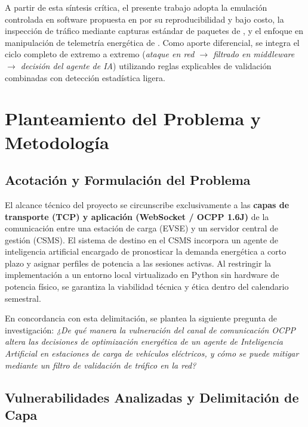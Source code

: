 \documentclass[conference]{IEEEtran}
\begin{document}
A partir de esta síntesis crítica, el presente trabajo adopta la emulación controlada en software propuesta en \cite{elmo2023} por su reproducibilidad y bajo costo, la inspección de tráfico mediante capturas estándar de paquetes de \cite{terruggia2025}, y el enfoque en manipulación de telemetría energética de \cite{jahangir2024,rahman2026}. Como aporte diferencial, se integra el ciclo completo de extremo a extremo (\textit{ataque en red $\rightarrow$ filtrado en middleware $\rightarrow$ decisión del agente de IA}) utilizando reglas explicables de validación combinadas con detección estadística ligera.

\FloatBarrier
\section{Planteamiento del Problema y Metodología}
\label{sec:metodologia}

\subsection{Acotación y Formulación del Problema}

El alcance técnico del proyecto se circunscribe exclusivamente a las \textbf{capas de transporte (TCP) y aplicación (WebSocket / OCPP 1.6J)} de la comunicación entre una estación de carga (EVSE) y un servidor central de gestión (CSMS). El sistema de destino en el CSMS incorpora un agente de inteligencia artificial encargado de pronosticar la demanda energética a corto plazo y asignar perfiles de potencia a las sesiones activas. Al restringir la implementación a un entorno local virtualizado en Python sin hardware de potencia físico, se garantiza la viabilidad técnica y ética dentro del calendario semestral.

En concordancia con esta delimitación, se plantea la siguiente pregunta de investigación: \textit{¿De qué manera la vulneración del canal de comunicación OCPP altera las decisiones de optimización energética de un agente de Inteligencia Artificial en estaciones de carga de vehículos eléctricos, y cómo se puede mitigar mediante un filtro de validación de tráfico en la red?}

\subsection{Vulnerabilidades Analizadas y Delimitación de Capa}
\end{document}
